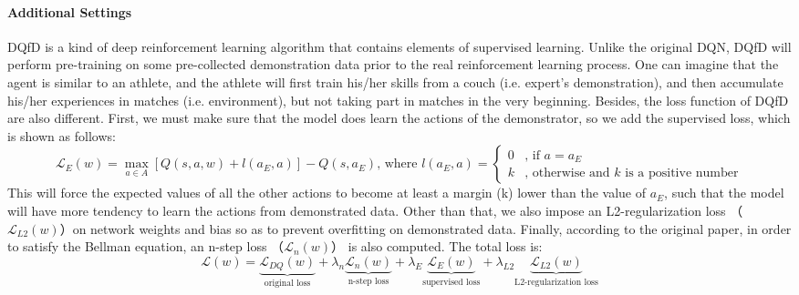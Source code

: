 \documentclass[a0,portrait]{a0poster}
\begin{document}
\begin{multicols}{2}
\paragraph{Additional Settings}
DQfD is a kind of deep reinforcement learning algorithm that contains elements of supervised learning. Unlike the original DQN, DQfD will perform pre-training on some pre-collected demonstration data prior to the real reinforcement learning process. One can imagine that the agent is similar to an athlete, and the athlete will first train his/her skills from a couch (i.e. expert's demonstration), and then accumulate his/her experiences in matches (i.e. environment), but not taking part in matches in the very beginning. Besides, the loss function of DQfD are also different. First, we must make sure that the model does learn the actions of the demonstrator, so we add the supervised loss, which is shown as follows:
\[\mathcal{L}_E(w) = \underset{a \in A}\max [Q(s,a,w) + l(a_E, a)] - Q(s, a_E)\text{, where }l(a_E, a) = \left\{\begin{array}{cl}0 & \text{, if } a = a_E\\ k & \text{, otherwise and } k \text{ is a positive number}\end{array}\right.\]
This will force the expected values of all the other actions to become at least a margin (k) lower than the value of $a_E$, such that the model will have more tendency to learn the actions from demonstrated data. Other than that, we also impose an L2-regularization loss （$\mathcal{L}_{L2}(w)$）on network weights and bias so as to prevent overfitting on demonstrated data. Finally, according to the original paper, in order to satisfy the Bellman equation, an n-step loss （$\mathcal{L}_n(w)$） is also computed. The total loss is:
\[\mathcal{L}(w) = \underbrace{\mathcal{L}_{DQ}(w)}_{\text{original loss}} + \lambda_n \underbrace{\mathcal{L}_{n}(w)}_{\text{n-step loss}} + \lambda_E \underbrace{\mathcal{L}_{E}(w)}_{\text{supervised loss}} + \lambda_{L2} \underbrace{\mathcal{L}_{L2}(w)}_{\text{L2-regularization loss}}\]


\end{multicols}
\end{document}
